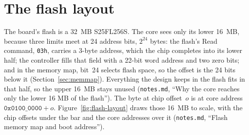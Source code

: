 \documentclass[11pt,a4paper]{report}
\newcommand{\notes}[1]{(\texttt{notes.md}, ``#1'')}
\begin{document}
\section{The flash layout}

The board's flash is a 32~MB S25FL256S. The core sees only its lower 16~MB, because three
limits meet at 24 address bits, $2^{24}$ bytes: the flash's Read command, \texttt{03h}, carries
a 3-byte address, which the chip completes into its lower half; the controller fills that field
with a 22-bit word address and two zero bits; and in the memory map, bit~24 selects flash
space, so the offset is the 24 bits below it (Section~\ref{sec:memmap}). Everything the design
keeps in the flash fits in that half, so the upper 16~MB stays unused \notes{Why the core
reaches only the lower 16 MB of the flash}. The byte at chip offset~$o$ is at core address
$\texttt{0x0100\_0000} + o$. Figure~\ref{fig:flash-layout} draws those 16~MB to scale, with
the chip offsets under the bar and the core addresses over it \notes{Flash memory map and boot
address}.
\end{document}
